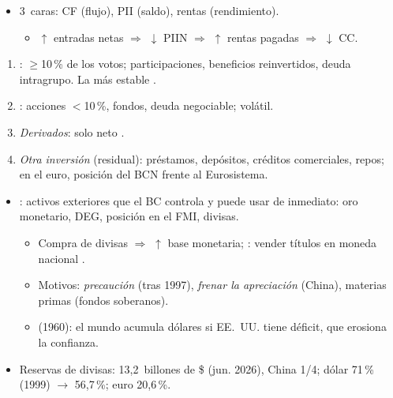 \documentclass{article}
\begin{document}
\begin{columnas}
\begin{itemize}
\item 3~caras: CF (flujo), PII (saldo), rentas (rendimiento).
  \begin{itemize}
  \item $\uparrow$ entradas netas $\Rightarrow$ $\downarrow$ PIIN $\Rightarrow$ $\uparrow$ rentas pagadas $\Rightarrow$ $\downarrow$ CC.
  \end{itemize}
\end{itemize}
\begin{enumerate}
\item {}: $\geq$10\,\% de los votos; participaciones, beneficios reinvertidos, deuda intragrupo. La más estable .
\item {}: acciones $<$10\,\%, fondos, deuda negociable; volátil.
\item \emph{Derivados}: solo neto .
\item \emph{Otra inversión} (residual): préstamos, depósitos, créditos comerciales, repos; en el euro, posición del BCN frente al Eurosistema.
\end{enumerate}
\begin{itemize}
\item {}: activos exteriores que el BC controla y puede usar de inmediato: oro monetario, DEG, posición en el FMI, divisas.
  \begin{itemize}
  \item Compra de divisas $\Rightarrow$ $\uparrow$ base monetaria; : vender títulos en moneda nacional .
  \item Motivos: \emph{precaución} (tras 1997), \emph{frenar la apreciación} (China), materias primas (fondos soberanos).
  \item {} (1960): el mundo acumula dólares si EE.~UU. tiene déficit, que erosiona la confianza.
  \end{itemize}
\item Reservas de divisas: 13,2~billones de \$ (jun. 2026), China 1/4; dólar 71\,\% (1999) $\to$ 56,7\,\%; euro 20,6\,\%.
\end{itemize}

\end{columnas}
\end{document}
